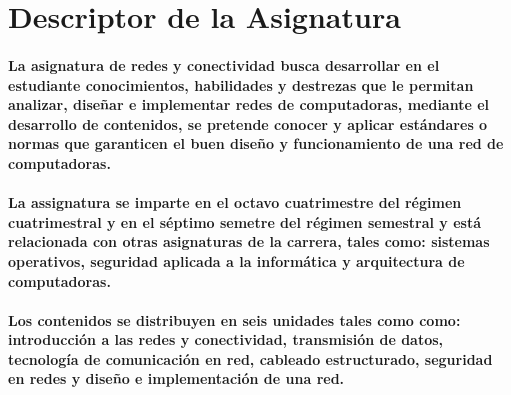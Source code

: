 \section*{Descriptor de la Asignatura}

\paragraph{La asignatura de redes y conectividad busca desarrollar en el estudiante conocimientos, habilidades y destrezas que le permitan analizar, diseñar e implementar redes de computadoras, mediante el desarrollo de contenidos, se pretende conocer y aplicar estándares o normas que garanticen el buen diseño y funcionamiento de una red de computadoras.}

\paragraph{La assignatura se imparte en el octavo cuatrimestre del régimen cuatrimestral y en el séptimo semetre del régimen semestral y está relacionada con otras asignaturas de la carrera, tales como: sistemas operativos, seguridad aplicada a la informática y arquitectura de computadoras.}

\paragraph{Los contenidos se distribuyen en seis unidades tales como como: introducción a las redes y conectividad, transmisión de datos, tecnología de comunicación en red, cableado estructurado, seguridad en redes y diseño e implementación de una red.}